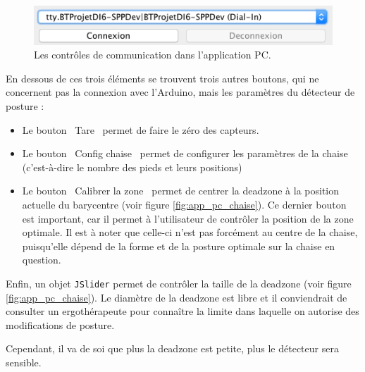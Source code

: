 \documentclass{polytech/polytech}
\begin{document}
\begin{figure}[htbp]
\begin{center}
\includegraphics[width=12cm]{image/app_pc_comms}
\end{center}
\caption{Les contrôles de communication dans l'application PC.}
\label{fig:app_pc_comms}
\end{figure}

En dessous de ces trois éléments se trouvent trois autres boutons, qui ne concernent pas la connexion avec l'Arduino, mais les paramètres du détecteur de posture : 
\begin{itemize}
\item Le bouton \guillemotleft\ Tare \guillemotright\ permet de faire le zéro des capteurs.
\item Le bouton \guillemotleft\ Config chaise \guillemotright\ permet de configurer les paramètres de la chaise (c'est-à-dire le nombre des pieds et leurs positions)
\item Le bouton \guillemotleft\ Calibrer la zone \guillemotright\ permet de centrer la deadzone à la position actuelle du barycentre (voir figure \ref{fig:app_pc_chaise}). Ce dernier bouton est important, car il permet à l'utilisateur de contrôler la position de la zone optimale. 
Il est à noter que celle-ci n'est pas forcément au centre de la chaise, puisqu'elle dépend de la forme et de la posture optimale sur la chaise en question.
\end{itemize}

Enfin, un objet \texttt{JSlider} permet de contrôler la taille de la deadzone (voir figure \ref{fig:app_pc_chaise}). 
Le diamètre de la deadzone est libre et il conviendrait de consulter un ergothérapeute pour connaître la limite dans laquelle on autorise des modifications de posture.

Cependant, il va de soi que plus la deadzone est petite, plus le détecteur sera sensible.

\end{document}
